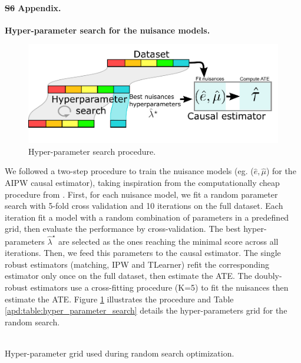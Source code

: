 \documentclass[10pt,letterpaper]{article}
\providecommand{\DIFaddtex}[1]{{\protect\color{blue}\uwave{#1}}} %
\providecommand{\DIFdeltex}[1]{{\protect\color{red}\sout{#1}}}                      %
\providecommand{\DIFaddbegin}{} %
\providecommand{\DIFaddend}{} %
\providecommand{\DIFdelbegin}{} %
\providecommand{\DIFdelend}{} %
\providecommand{\DIFadd}[1]{\texorpdfstring{\DIFaddtex{#1}}{#1}} %
\providecommand{\DIFdel}[1]{\texorpdfstring{\DIFdeltex{#1}}{}} %
\newcommand{\DIFscaledelfig}{0.5}
\newlength{\DIFdelgraphicswidth} %
\newlength{\DIFdelgraphicsheight} %
\newcommand{\DIFaddincludegraphics}[2][]{{\color{blue}\fbox{\DIFOincludegraphics[#1]{#2}}}} %
\newcommand{\DIFdelincludegraphics}[2][]{%
\sbox{\DIFdelgraphicsbox}{\DIFOincludegraphics[#1]{#2}}%
\settoboxwidth{\DIFdelgraphicswidth}{\DIFdelgraphicsbox} %
\settoboxtotalheight{\DIFdelgraphicsheight}{\DIFdelgraphicsbox} %
\scalebox{\DIFscaledelfig}{%
\parbox[b]{\DIFdelgraphicswidth}{\usebox{\DIFdelgraphicsbox}\\[-\baselineskip] \rule{\DIFdelgraphicswidth}{0em}}\llap{\resizebox{\DIFdelgraphicswidth}{\DIFdelgraphicsheight}{%
\setlength{\unitlength}{\DIFdelgraphicswidth}%
\begin{picture}(1,1)%
\thicklines\linethickness{2pt} %
{\color[rgb]{1,0,0}\put(0,0){\framebox(1,1){}}}%
{\color[rgb]{1,0,0}\put(0,0){\line( 1,1){1}}}%
{\color[rgb]{1,0,0}\put(0,1){\line(1,-1){1}}}%
\end{picture}%
}\hspace*{3pt}}} %
} %
\DeclareRobustCommand{\DIFaddbegin}{\DIFOaddbegin \let\includegraphics\DIFaddincludegraphics} %
\DeclareRobustCommand{\DIFaddend}{\DIFOaddend \let\includegraphics\DIFOincludegraphics} %
\DeclareRobustCommand{\DIFdelbegin}{\DIFOdelbegin \let\includegraphics\DIFdelincludegraphics} %
\DeclareRobustCommand{\DIFdelend}{\DIFOaddend \let\includegraphics\DIFOincludegraphics} %
\begin{document}
\paragraph*{\DIFdelbegin \DIFdel{S6 }\DIFdelend \DIFaddbegin \DIFadd{S5 }\DIFaddend Appendix.}
\label{apd:hyper_parameter_search}
{\bf Hyper-parameter search for the nuisance models.}
\begin{figure}[!b]
  \begin{minipage}{.38\linewidth}
    \caption{Hyper-parameter search procedure.}\label{apd:fig:hyper_parameter_search}
  \end{minipage}%
  \hfill
  \begin{minipage}{.6\linewidth}
    \includegraphics[width=\linewidth]{img_supp/hp_search_procedure.pdf}
  \end{minipage}%
\end{figure}
We followed a two-step procedure to train the nuisance models (eg. ($\hat e,
  \hat \mu$) for the AIPW causal estimator), taking inspiration from the
computationally cheap procedure from
\cite[section~3.3]{bouthillier2021accounting}. First, for each nuisance
model, we fit a random parameter search with 5-fold cross validation and 10
iterations on the full dataset. Each iteration fit a model with a random
combination of parameters in a predefined grid, then evaluate the
performance by cross-validation. The best hyper-parameters $\hat
  \lambda^{\star}$ are selected as the ones reaching the minimal score across
all iterations. Then, we feed this parameters to the causal estimator. The
single robust estimators (matching, IPW and TLearner) refit the
corresponding estimator only once on the full dataset, then estimate the
ATE. The doubly-robust estimators use a cross-fitting procedure (K=5) to fit
the nuisances then estimate the ATE. Figure
\ref{apd:fig:hyper_parameter_search} illustrates the procedure and Table
\ref{apd:table:hyper_parameter_search} details the hyper-parameters grid for
the random search.


\begin{table}[]
  \resizebox{\textwidth}{!}{%
    
  }\\
  \caption{Hyper-parameter grid used during random search
    optimization.}\label{apd:table:hyper_parameter_search}
\end{table}
\clearpage
\end{document}
